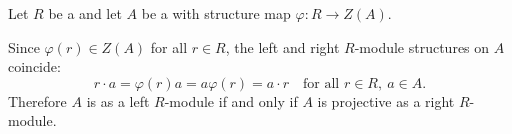\begin{proposition} \label{proposition:central_algebra_projective_left_iff_right}
    Let $R$ be a  and let $A$ be a  with structure map $\varphi: R \to Z(A)$.

    Since $\varphi(r) \in Z(A)$ for all $r \in R$, the left and right $R$-module structures on $A$ coincide:
    $$r \cdot a = \varphi(r)a = a\varphi(r) = a \cdot r \quad \text{for all } r \in R,\ a \in A.$$
    Therefore $A$ is  as a left $R$-module if and only if $A$ is projective as a right $R$-module.
\end{proposition}
